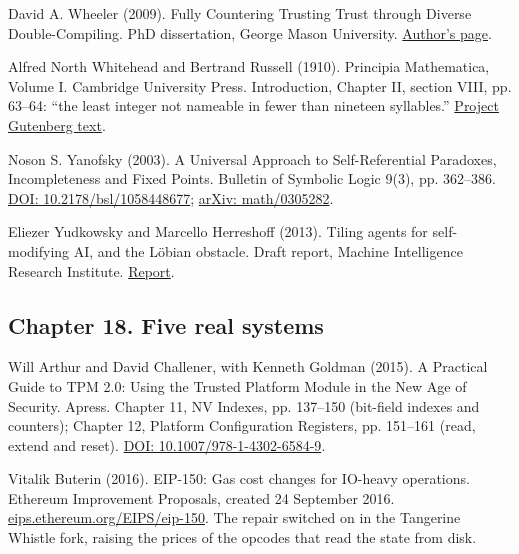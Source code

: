 \documentclass[11pt,twoside]{article}
\theoremstyle{thielethm}
\theoremstyle{thieledef}
\theoremstyle{thieledef}
\theoremstyle{thieledef}
\theoremstyle{thielethm}
\theoremstyle{thieleobs}
\theoremstyle{thielethm}
\begin{document}
\noindent David A. Wheeler (2009). Fully Countering Trusting Trust through Diverse Double-Compiling. PhD dissertation, George Mason University. \href{https://dwheeler.com/trusting-trust/}{Author's page}.
\par\medskip

\noindent Alfred North Whitehead and Bertrand Russell (1910). Principia Mathematica, Volume I. Cambridge University Press. Introduction, Chapter II, section VIII, pp. 63--64: ``the least integer not nameable in fewer than nineteen syllables.'' \href{https://www.gutenberg.org/ebooks/78050}{Project Gutenberg text}.
\par\medskip

\noindent Noson S. Yanofsky (2003). A Universal Approach to Self-Referential Paradoxes, Incompleteness and Fixed Points. Bulletin of Symbolic Logic 9(3), pp. 362--386. \href{https://doi.org/10.2178/bsl/1058448677}{DOI: 10.2178/bsl/1058448677}; \href{https://arxiv.org/abs/math/0305282}{arXiv: math/0305282}.
\par\medskip

\noindent Eliezer Yudkowsky and Marcello Herreshoff (2013). Tiling agents for self-modifying AI, and the L\"obian obstacle. Draft report, Machine Intelligence Research Institute. \href{https://intelligence.org/files/TilingAgentsDraft.pdf}{Report}.
\par\medskip

\subsection*{Chapter 18. Five real systems}

\noindent Will Arthur and David Challener, with Kenneth Goldman (2015). A Practical Guide to TPM 2.0: Using the Trusted Platform Module in the New Age of Security. Apress. Chapter 11, NV Indexes, pp. 137--150 (bit-field indexes and counters); Chapter 12, Platform Configuration Registers, pp. 151--161 (read, extend and reset). \href{https://doi.org/10.1007/978-1-4302-6584-9}{DOI: 10.1007/978-1-4302-6584-9}.
\par\medskip

\noindent Vitalik Buterin (2016). EIP-150: Gas cost changes for IO-heavy operations. Ethereum Improvement Proposals, created 24 September 2016. \href{https://eips.ethereum.org/EIPS/eip-150}{eips.ethereum.org/EIPS/eip-150}. The repair switched on in the Tangerine Whistle fork, raising the prices of the opcodes that read the state from disk.
\par\medskip
\end{document}
